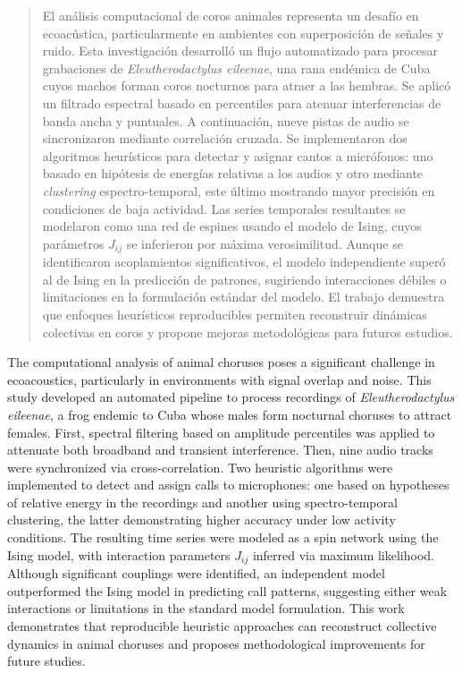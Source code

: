 \begin{abstract}
    El análisis computacional de coros animales representa un 
desafío en ecoacústica, particularmente en ambientes con 
superposición de señales y ruido. Esta investigación 
desarrolló un flujo automatizado para procesar grabaciones 
de \emph{Eleutherodactylus eileenae}, una rana endémica de 
Cuba cuyos machos forman coros nocturnos para atraer a las hembras. 
Se aplicó un filtrado espectral basado en percentiles 
para atenuar interferencias de banda ancha y puntuales. A continuación, 
nueve pistas de audio se sincronizaron mediante correlación cruzada. 
Se implementaron dos algoritmos heurísticos para detectar y asignar 
cantos a micrófonos: uno basado en hipótesis de energías relativas a los audios 
y otro mediante \emph{clustering} espectro-temporal, este último 
mostrando mayor precisión en condiciones de baja actividad. Las series 
temporales resultantes se modelaron como una red de espines usando 
el modelo de Ising, cuyos parámetros \(J_{ij}\) se inferieron por 
máxima verosimilitud. Aunque se identificaron acoplamientos significativos, 
el modelo independiente superó al de Ising en la predicción de patrones, 
sugiriendo interacciones débiles o limitaciones en la formulación estándar 
del modelo. El trabajo demuestra que enfoques heurísticos reproducibles 
permiten reconstruir dinámicas colectivas en coros y propone mejoras 
metodológicas para futuros estudios.
\end{abstract}

\begin{enabstract}
The computational analysis of animal choruses poses a significant 
challenge in ecoacoustics, particularly in environments with 
signal overlap and noise. This study developed an automated pipeline 
to process recordings of \emph{Eleutherodactylus eileenae}, a frog 
endemic to Cuba whose males form nocturnal choruses to attract females. 
First, spectral filtering based on amplitude percentiles was applied 
to attenuate both broadband and transient interference. Then, nine audio 
tracks were synchronized via cross-correlation. Two heuristic algorithms 
were implemented to detect and assign calls to microphones: one based 
on hypotheses of relative energy in the recordings and another using 
spectro-temporal clustering, the latter demonstrating higher accuracy 
under low activity conditions. The resulting time series were modeled 
as a spin network using the Ising model, with interaction parameters 
\(J_{ij}\) inferred via maximum likelihood. Although significant 
couplings were identified, an independent model outperformed the 
Ising model in predicting call patterns, suggesting either weak 
interactions or limitations in the standard model formulation. This 
work demonstrates that reproducible heuristic approaches can reconstruct 
collective dynamics in animal choruses and proposes methodological 
improvements for future studies.
\end{enabstract}